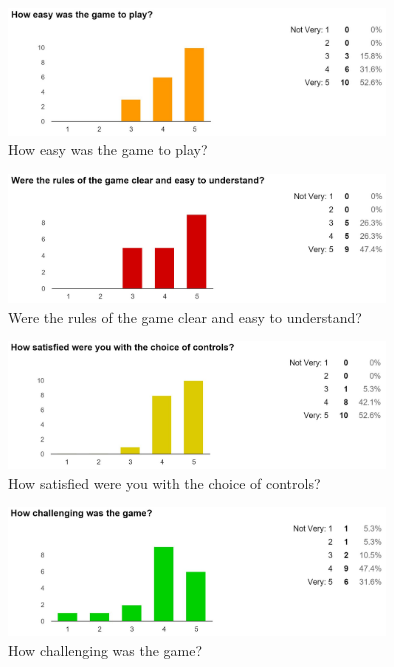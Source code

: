 \documentclass[12pt]{article}
\begin{document}
\begin{figure}[H]
	\centering
	\includegraphics[width = 10cm]{Easy_Play}
	\caption{How easy was the game to play?}
	\label{How easy was the game to play?}
\end{figure}

\begin{figure}[H]
	\centering
	\includegraphics[width = 10cm]{Rules}
	\caption{Were the rules of the game clear and easy to understand?}
	\label{Were the rules of the game clear and easy to understand?}
\end{figure}

\begin{figure}[H]
	\centering
	\includegraphics[width = 10cm]{Controls}
	\caption{How satisfied were you with the choice of controls?}
	\label{How satisfied were you with the choice of controls?}
\end{figure}

\begin{figure}[H]
	\centering
	\includegraphics[width = 10cm]{Challenging}
	\caption{How challenging was the game?}
	\label{How challenging was the game?}
\end{figure}
\end{document}
